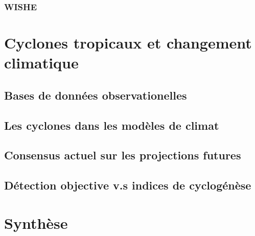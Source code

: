 \documentclass[../main.tex]{subfiles}
\begin{document}
\subsubsection{WISHE}

\section{Cyclones tropicaux et changement climatique}

\subsection{Bases de données observationelles}

\subsection{Les cyclones dans les modèles de climat}

\subsection{Consensus actuel sur les projections futures}

\subsection{Détection objective v.s indices de cyclogénèse}

\section{Synthèse}
\end{document}
